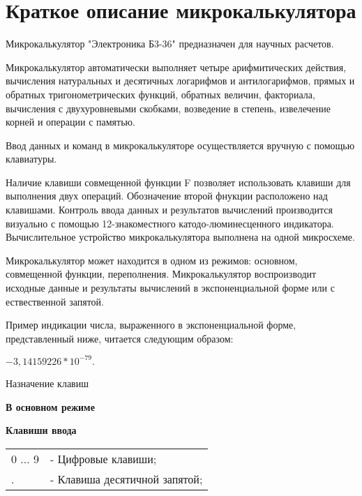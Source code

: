 \documentclass[12pt]{article} %
\begin{document}
\section{Краткое описание микрокалькулятора}


Микрокалькулятор "Электроника Б3-36" предназначен для научных расчетов.

Микрокалькулятор автоматически выполняет четыре арифмитических действия, вычисления натуральных и десятичных логарифмов и антилогарифмов, прямых и обратных тригонометрических функций, обратных величин, факториала, вычисления с двухуровневыми скобками, возведение в степень, извелечение корней и операции с памятью.

Ввод данных и команд в микрокалькуляторе осуществляется вручную с помощью клавиатуры.

Наличие клавиши совмещенной функции F позволяет использовать клавиши для выполнения двух операций. Обозначение второй фнукции расположено над клавишами. Контроль ввода данных и результатов вычислений производится визуально с помощью 12-знакоместного катодо-люминесценного индикатора. Вычислительное устройство микрокалькулятора выполнена на одной микросхеме.

Микрокалькулятор может находится в одном из режимов: основном, совмещенной функции, переполнения. Микрокалькулятор воспроизводит исходные данные и результаты вычислений в экспоненциальной форме или с ествественной запятой.

Пример индикации числа, выраженного в экспоненциальной форме, представленный ниже, читается следующим образом: 

\begin{center}
$-3,14159226 * 10^{-79}.$
\end{center}


{\centering Назначение клавиш \par}
\vspace{0.25cm}

\textbf{В основном режиме}
\vspace{0.25cm}

\textbf{Клавиши ввода}
\vspace{0.5cm}

\begin{tabular}{p{2cm} p{9cm}}
0 ... 9 & - Цифровые клавиши; \\
.       & - Клавиша десятичной запятой; \\
\end{tabular}

\newpage
\end{document}
